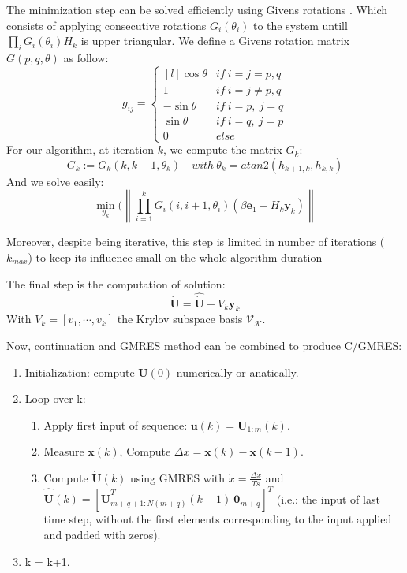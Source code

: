 \documentclass[a4paper, 12pt]{report}
\newcommand\norm[1]{\left\lVert#1\right\rVert}
\begin{document}
The minimization step can be solved efficiently using Givens rotations \cite{Bjorck1996}. Which consists of applying consecutive rotations $G_i(\theta_i)$ to the system untill $\prod_i G_i(\theta_i) H_k$ is upper triangular.
We define a Givens rotation matrix $G(p, q, \theta)$ as follow:
\[ g_{ij} = \left\{ \begin{matrix*}[l] \cos{\theta} &  if\ i = j = p, q \\ 1 & if\ i = j \neq p, q  \\  -\sin{\theta} &  if\ i = p,\ j = q \\ \sin{\theta} &  if\ i = q,\ j = p \\ 0 & else \end{matrix*} \right.\]
For our algorithm, at iteration $k$, we compute the matrix $G_k$:
\[ G_k := G_k(k, k+1, \theta_k) \quad with\ \theta_k = atan2(h_{k+1, k}, h_{k,k})\]
And we solve easily:
\[ \min\limits_{y_k}(\norm{\prod\limits_{i=1}^k G_i(i, i+1, \theta_i) (\beta \boldsymbol{e}_1 - H_k \boldsymbol{y}_k)} \]

Moreover, despite being iterative, this step is limited in number of iterations ($k_{max}$) to keep its influence small on the whole algorithm duration

The final step is the computation of solution:
\[ \boldsymbol{\dot U} = \boldsymbol{\hat{ \dot U}} + V_k \boldsymbol{y}_k \]
With $V_k = [v_1, \cdots, v_k]$ the Krylov subspace basis $\mathcal{V}_\mathcal{K}$.

Now, continuation and GMRES method can be combined to produce C/GMRES:
\begin{enumerate}
\item Initialization: compute $\boldsymbol{U}(0)$ numerically or anatically.
\item Loop over k:
\begin{enumerate}
\item Apply first input of sequence: $\boldsymbol{u}(k) = \boldsymbol{U}_{1:m}(k)$.
\item Measure $\boldsymbol{x}(k)$, Compute $\Delta x = \boldsymbol{x}(k) - \boldsymbol{x}(k-1)$.
\item Compute $\boldsymbol{\dot U}(k)$ using GMRES with $\dot x = \frac{\Delta x}{Ts}$ and $\boldsymbol{\hat{\dot U}}(k) = [\boldsymbol{\dot U}^T_{m+q+1:N(m+q)}(k-1)\ \boldsymbol{0}_{m+q}]^T $ (i.e.: the input of last time step, without the first elements corresponding to the input applied and padded with zeros).
\end{enumerate}
\item k = k+1.
\end{enumerate}
\end{document}
